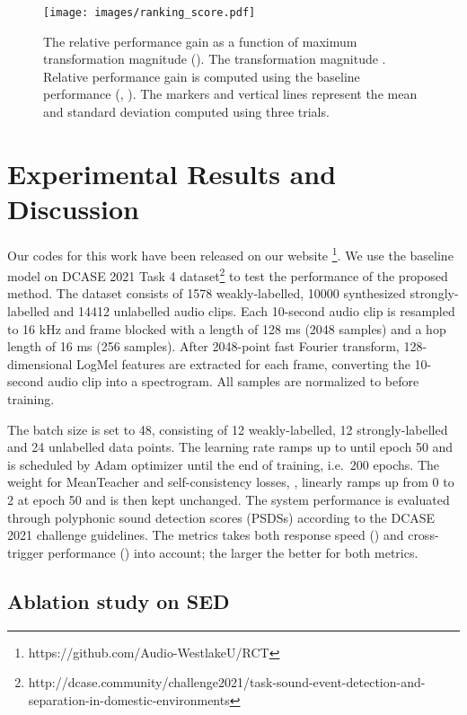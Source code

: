 \documentclass[a4paper]{article}
\begin{document}
\begin{figure}[htb]
\begin{minipage}[b]{1.0\linewidth}
  \centering
  \centerline{\texttt{[image: images/ranking\_score.pdf]}}
\end{minipage}
\caption{The relative performance gain as a function of maximum transformation magnitude (). The transformation magnitude . Relative performance gain is computed using the baseline performance (, ). The markers and vertical lines represent the mean and standard deviation computed using three trials.}
\vspace{-1mm}
\label{figure: rank}
\end{figure}

\section{Experimental Results and Discussion}
\label{sec:typestyle}
Our codes for this work have been released on our website \footnote{https://github.com/Audio-WestlakeU/RCT}. We use the baseline model \cite{jiakai2018mean} on DCASE 2021 Task 4 dataset\footnote{http://dcase.community/challenge2021/task-sound-event-detection-and-separation-in-domestic-environments} to test the performance of the proposed method. The dataset consists of 1578 weakly-labelled, 10000 synthesized strongly-labelled and 14412 unlabelled audio clips. Each 10-second audio clip is resampled to 16 kHz and frame blocked with a length of 128 ms (2048 samples) and a hop length of 16 ms (256 samples). After 2048-point fast Fourier transform, 128-dimensional LogMel features are extracted for each frame, converting the 10-second audio clip into a  spectrogram. All samples are normalized to  before training.

The batch size is set to 48, consisting of 12 weakly-labelled, 12 strongly-labelled and 24 unlabelled data points. The learning rate ramps up to  until epoch 50 and is scheduled by Adam optimizer \cite{kingma2015adam} until the end of training, i.e.~200 epochs. The weight for MeanTeacher and self-consistency losses, , linearly ramps up from 0 to 2 at epoch 50 and is then kept unchanged. The system performance is evaluated through polyphonic sound detection scores (PSDSs) \cite{mesaros2016metrics} according to the DCASE 2021 challenge guidelines. The metrics takes both response speed () and cross-trigger performance () into account; the larger the better for both metrics.

\subsection{Ablation study on SED}
\end{document}
